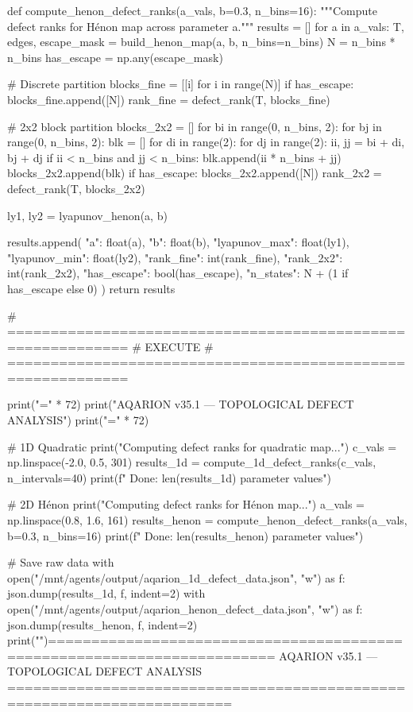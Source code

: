 {{{{{{{{{{{{{def compute_henon_defect_ranks(a_vals, b=0.3, n_bins=16):
    """Compute defect ranks for Hénon map across parameter a."""
    results = []
    for a in a_vals:
        T, edges, escape_mask = build_henon_map(a, b, n_bins=n_bins)
        N = n_bins * n_bins
        has_escape = np.any(escape_mask)
        
        # Discrete partition
        blocks_fine = [[i] for i in range(N)]
        if has_escape:
            blocks_fine.append([N])
        rank_fine = defect_rank(T, blocks_fine)
        
        # 2x2 block partition
        blocks_2x2 = []
        for bi in range(0, n_bins, 2):
            for bj in range(0, n_bins, 2):
                blk = []
                for di in range(2):
                    for dj in range(2):
                        ii, jj = bi + di, bj + dj
                        if ii < n_bins and jj < n_bins:
                            blk.append(ii * n_bins + jj)
                blocks_2x2.append(blk)
        if has_escape:
            blocks_2x2.append([N])
        rank_2x2 = defect_rank(T, blocks_2x2)
        
        ly1, ly2 = lyapunov_henon(a, b)
        
        results.append({
            "a": float(a),
            "b": float(b),
            "lyapunov_max": float(ly1),
            "lyapunov_min": float(ly2),
            "rank_fine": int(rank_fine),
            "rank_2x2": int(rank_2x2),
            "has_escape": bool(has_escape),
            "n_states": N + (1 if has_escape else 0)
        })
    return results


# ============================================================
# EXECUTE
# ============================================================

print("=" * 72)
print("AQARION v35.1 — TOPOLOGICAL DEFECT ANALYSIS")
print("=" * 72)

# 1D Quadratic
print("\n[1D] Computing defect ranks for quadratic map...")
c_vals = np.linspace(-2.0, 0.5, 301)
results_1d = compute_1d_defect_ranks(c_vals, n_intervals=40)
print(f"  Done: {len(results_1d)} parameter values")

# 2D Hénon
print("\n[2D] Computing defect ranks for Hénon map...")
a_vals = np.linspace(0.8, 1.6, 161)
results_henon = compute_henon_defect_ranks(a_vals, b=0.3, n_bins=16)
print(f"  Done: {len(results_henon)} parameter values")

# Save raw data
with open("/mnt/agents/output/aqarion_1d_defect_data.json", "w") as f:
    json.dump(results_1d, f, indent=2)
with open("/mnt/agents/output/aqarion_henon_defect_data.json", "w") as f:
    json.dump(results_henon, f, indent=2)
print("")========================================================================
AQARION v35.1 — TOPOLOGICAL DEFECT ANALYSIS
========================================================================

}}}}}}}}}}}}}

